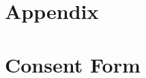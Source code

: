\documentclass[12pt]{caltech_thesis}
\begin{document}
\mainmatter













\printbibliography[heading=bibintoc]

\appendix

\chapter{Appendix}
\chapter{Consent Form}
\end{document}

